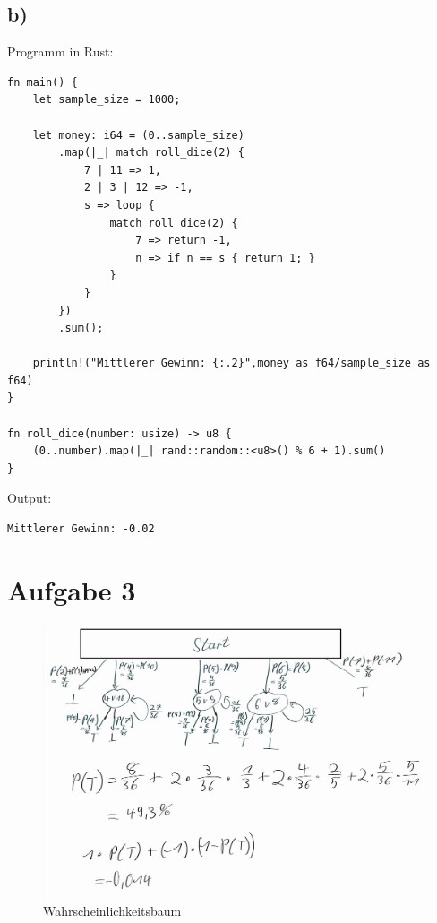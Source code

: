 \documentclass[a4paper]{scrartcl}
\begin{document}
\subsection*{b)}
Programm in Rust:
\begin{lstlisting}
fn main() {
	let sample_size = 1000;
	
	let money: i64 = (0..sample_size)
		.map(|_| match roll_dice(2) {
			7 | 11 => 1,
			2 | 3 | 12 => -1,
			s => loop {
				match roll_dice(2) {
					7 => return -1,
					n => if n == s { return 1; }
				}   
			}
		})
		.sum();

	println!("Mittlerer Gewinn: {:.2}",money as f64/sample_size as f64)
}

fn roll_dice(number: usize) -> u8 {
	(0..number).map(|_| rand::random::<u8>() % 6 + 1).sum()
}   
\end{lstlisting}
Output:
\begin{verbatim}
Mittlerer Gewinn: -0.02
\end{verbatim}
\newpage
\section*{Aufgabe 3}
\begin{figure}[h]
	\centering
	\includegraphics[width=0.95\linewidth]{./a3.jpg}
	\caption{Wahrscheinlichkeitsbaum}
	\label{fig:3}
\end{figure}
\end{document}
